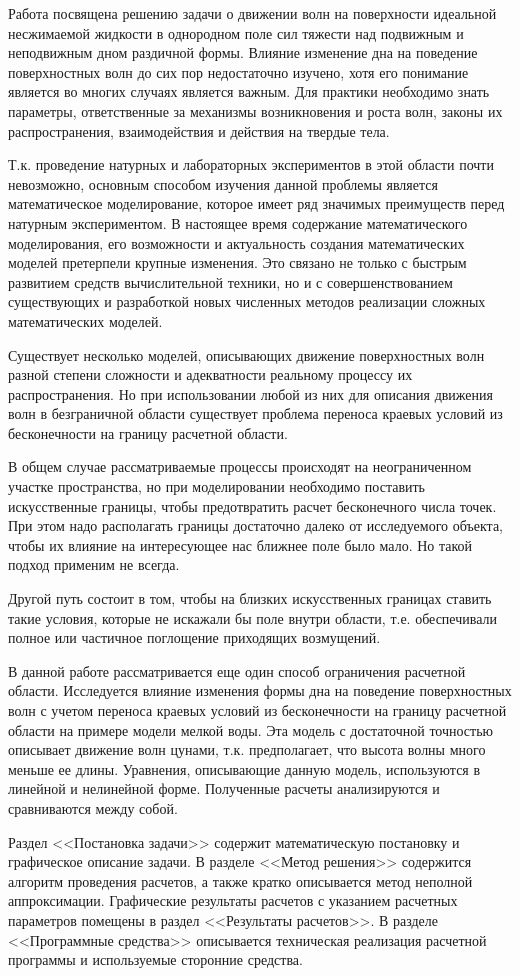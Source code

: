 Работа посвящена решению задачи о движении волн на поверхности идеальной несжимаемой жидкости в однородном поле сил тяжести над подвижным и неподвижным дном раздичной формы. Влияние изменение дна на поведение поверхностных волн до сих пор недостаточно изучено, хотя его понимание является во многих случаях является важным. Для практики необходимо знать параметры, ответственные за механизмы возникновения и роста волн, законы их распространения, взаимодействия и действия на твердые тела.

Т.к. проведение натурных и лабораторных экспериментов в этой области почти невозможно, основным способом изучения данной проблемы является математическое моделирование, которое имеет ряд значимых преимуществ перед натурным экспериментом. В настоящее время содержание математического моделирования, его возможности и актуальность создания математических моделей претерпели крупные изменения. Это связано не только с быстрым развитием средств вычислительной техники, но и с совершенствованием существующих и разработкой новых численных методов реализации сложных математических моделей.

Существует несколько моделей, описывающих движение поверхностных волн разной степени сложности и адекватности реальному процессу их распространения. Но при использовании любой из них для описания движения волн в безграничной области существует проблема переноса краевых условий из бесконечности на границу расчетной области. 

В общем случае рассматриваемые процессы происходят на неограниченном участке пространства, но при моделировании необходимо поставить искусственные границы, чтобы предотвратить расчет бесконечного числа точек. При этом надо располагать границы достаточно далеко от исследуемого объекта, чтобы их влияние на интересующее нас ближнее поле было мало. Но такой подход применим не всегда.

Другой путь состоит в том, чтобы на близких искусственных границах ставить такие условия, которые не искажали бы поле внутри области, т.е. обеспечивали полное или частичное поглощение приходящих возмущений.

В данной работе рассматривается еще один способ ограничения расчетной области. Исследуется влияние изменения формы дна на поведение поверхностных волн с учетом переноса краевых условий из бесконечности на границу расчетной области на примере модели мелкой воды. Эта модель с достаточной точностью описывает движение волн цунами, т.к. предполагает, что высота волны много меньше ее длины. Уравнения, описывающие данную модель, используются в линейной и нелинейной форме. Полученные расчеты анализируются и сравниваются между собой.

Раздел <<Постановка задачи>> содержит математическую постановку и графическое описание задачи. В разделе <<Метод решения>> содержится алгоритм проведения расчетов, а также кратко описывается метод неполной аппроксимации. Графические результаты расчетов с указанием расчетных параметров помещены в раздел <<Результаты расчетов>>. В разделе <<Программные средства>> описывается техническая реализация расчетной программы и используемые сторонние средства.
